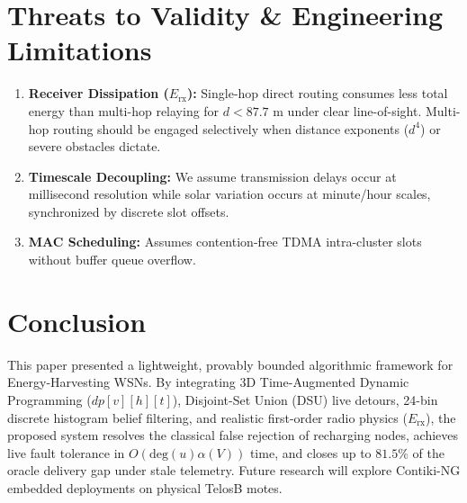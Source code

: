 \documentclass[conference]{IEEEtran}
\begin{document}
\section{Threats to Validity \& Engineering Limitations}
\begin{enumerate}
    \item \textbf{Receiver Dissipation ($E_{\text{rx}}$):} Single-hop direct routing consumes less total energy than multi-hop relaying for $d < 87.7\text{ m}$ under clear line-of-sight. Multi-hop routing should be engaged selectively when distance exponents ($d^4$) or severe obstacles dictate.
    \item \textbf{Timescale Decoupling:} We assume transmission delays occur at millisecond resolution while solar variation occurs at minute/hour scales, synchronized by discrete slot offsets.
    \item \textbf{MAC Scheduling:} Assumes contention-free TDMA intra-cluster slots without buffer queue overflow.
\end{enumerate}

\section{Conclusion}
This paper presented a lightweight, provably bounded algorithmic framework for Energy-Harvesting WSNs. By integrating 3D Time-Augmented Dynamic Programming ($dp[v][h][t]$), Disjoint-Set Union (DSU) live detours, 24-bin discrete histogram belief filtering, and realistic first-order radio physics ($E_{\text{rx}}$), the proposed system resolves the classical false rejection of recharging nodes, achieves live fault tolerance in $O(\text{deg}(u)\alpha(V))$ time, and closes up to $81.5\%$ of the oracle delivery gap under stale telemetry. Future research will explore Contiki-NG embedded deployments on physical TelosB motes.
\end{document}
